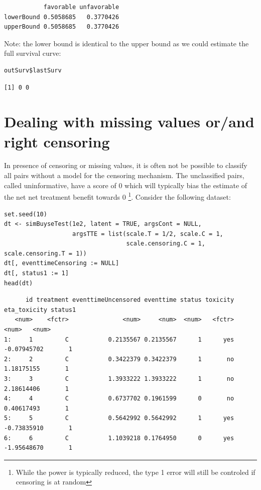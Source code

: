\documentclass[12pt]{article}
\begin{document}
\begin{verbatim}
           favorable unfavorable
lowerBound 0.5058685   0.3770426
upperBound 0.5058685   0.3770426
\end{verbatim}


Note: the lower bound is identical to the upper bound as we could
estimate the full survival curve:
\lstset{language=r,label= ,caption= ,captionpos=b,numbers=none}
\begin{lstlisting}
outSurv$lastSurv
\end{lstlisting}

\begin{verbatim}
[1] 0 0
\end{verbatim}


\clearpage

\section{Dealing with missing values or/and right censoring}
\label{sec:org3b883a0}

In presence of censoring or missing values, it is often not be
 possible to classify all pairs without a model for the censoring
 mechanism. The unclassified pairs, called uninformative, have a score
 of 0 which will typically bias the estimate of the net net treatment benefit
 towards 0 \footnote{While the power is typically reduced, the type 1 error
 will still be controled if censoring is at random}. Consider the
 following dataset:
\lstset{language=r,label= ,caption= ,captionpos=b,numbers=none}
\begin{lstlisting}
set.seed(10)
dt <- simBuyseTest(1e2, latent = TRUE, argsCont = NULL,
                   argsTTE = list(scale.T = 1/2, scale.C = 1,
                                  scale.censoring.C = 1, scale.censoring.T = 1))
dt[, eventtimeCensoring := NULL]
dt[, status1 := 1]
head(dt)
\end{lstlisting}

\begin{verbatim}
      id treatment eventtimeUncensored eventtime status toxicity eta_toxicity status1
   <num>    <fctr>               <num>     <num>  <num>   <fctr>        <num>   <num>
1:     1         C           0.2135567 0.2135567      1      yes  -0.07945702       1
2:     2         C           0.3422379 0.3422379      1       no   1.18175155       1
3:     3         C           1.3933222 1.3933222      1       no   2.18614406       1
4:     4         C           0.6737702 0.1961599      0       no   0.40617493       1
5:     5         C           0.5642992 0.5642992      1      yes  -0.73835910       1
6:     6         C           1.1039218 0.1764950      0      yes  -1.95648670       1
\end{verbatim}
\end{document}
